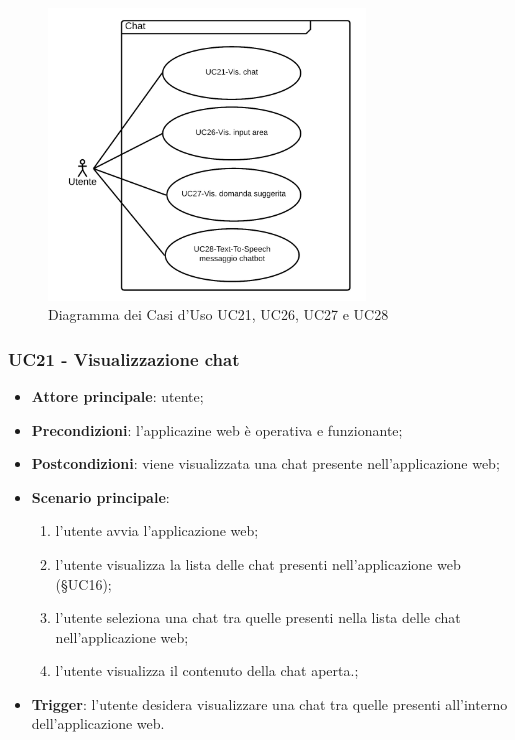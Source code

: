 \documentclass[10pt, a4paper]{article}
\begin{document}
    \begin{figure}[h]
        \centering
        \includegraphics[width=0.75\textwidth, height=0.75\textheight, keepaspectratio]{UC-images/UC21-UC26-UC27-UC28.png}
        \caption{Diagramma dei Casi d'Uso UC21, UC26, UC27 e UC28}
    \end{figure}
    
    \subsubsection{UC21 - Visualizzazione chat}
    \begin{itemize}
        \item \textbf{Attore principale}: utente;
        \item \textbf{Precondizioni}: l'applicazine web è operativa e funzionante;
        \item \textbf{Postcondizioni}: viene visualizzata una chat presente nell'applicazione web;
        \item \textbf{Scenario principale}:
            \begin{enumerate}
                \item l'utente avvia l'applicazione web;
                \item l'utente visualizza la lista delle chat presenti nell'applicazione web (\S UC16);
                \item l'utente seleziona una chat tra quelle presenti nella lista delle chat nell'applicazione web;
                \item l'utente visualizza il contenuto della chat aperta.;
            \end{enumerate}
        \item \textbf{Trigger}: l'utente desidera visualizzare una chat tra quelle presenti all'interno dell'applicazione web.
    \end{itemize}
\end{document}
